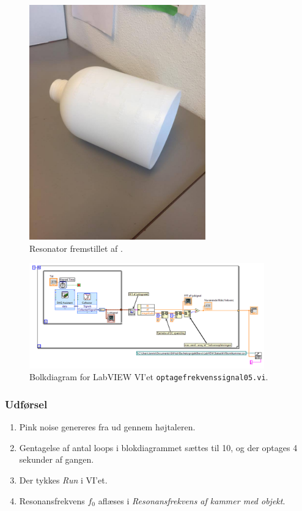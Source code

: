 	\begin{figure}
	\centering
	\includegraphics[width=3in]{resonator.jpg}
	\caption{Resonator fremstillet af .}
	\label{fig:resonator}	
	\end{figure}

	\begin{figure}
	\centering
	\includegraphics[width=4in]{optagefrekvenssignal05.png}
	\caption{Bolkdiagram for LabVIEW VI'et \texttt{optagefrekvenssignal05.vi}.}
	\label{fig:optagefrekvenssignal05}	
	\end{figure}
	
	\subsubsection{Udførsel}
			
			\begin{enumerate}
			\item Pink noise genereres fra \onlineg  ud gennem højtaleren. 
			\item Gentagelse af antal loops i blokdiagrammet sættes til 10, og der optages 4 sekunder af gangen. 
			\item Der tykkes \textit{Run} i VI'et. 
			\item Resonansfrekvens $f_{0}$ aflæses i \textit{Resonansfrekvens af kammer med objekt}.
			\end{enumerate}
			
